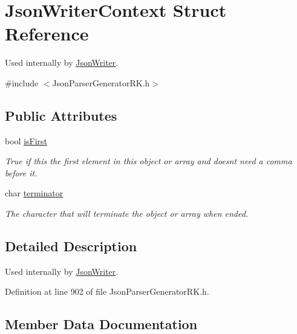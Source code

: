 \hypertarget{struct_json_writer_context}{}\section{Json\+Writer\+Context Struct Reference}
\label{struct_json_writer_context}


Used internally by \hyperlink{class_json_writer}{Json\+Writer}.  




{\ttfamily \#include $<$Json\+Parser\+Generator\+R\+K.\+h$>$}

\subsection*{Public Attributes}
\begin{DoxyCompactItemize}
\item 
bool \hyperlink{struct_json_writer_context_a533afb7eeecfe191549f1db1f596633d}{is\+First}
\begin{DoxyCompactList}\small\item\em True if this the first element in this object or array and doesn\textquotesingle{}t need a comma before it. \end{DoxyCompactList}\item 
char \hyperlink{struct_json_writer_context_ae37822121661863a0d70776b48cc3962}{terminator}
\begin{DoxyCompactList}\small\item\em The character that will terminate the object or array when ended. \end{DoxyCompactList}\end{DoxyCompactItemize}


\subsection{Detailed Description}
Used internally by \hyperlink{class_json_writer}{Json\+Writer}. 

Definition at line 902 of file Json\+Parser\+Generator\+R\+K.\+h.



\subsection{Member Data Documentation}
\mbox{\label{struct_json_writer_context_a533afb7eeecfe191549f1db1f596633d}} 
